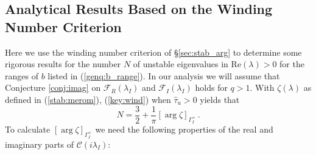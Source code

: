 \documentclass{article}%
\begin{document}
\subsection{Analytical Results Based on the Winding Number Criterion}
\label{genq:wind_number}

Here we use the winding number criterion of \S \ref{sec:stab_arg} to
determine some rigorous results for the number $N$ of unstable
eigenvalues in $\mbox{Re}(\lambda)>0$ for the ranges of $b$ listed in
(\ref{genq:b_range}). In our analysis we will assume that Conjecture
\ref{conj:imag} on ${\mathcal F}_R(\lambda_I)$ and ${\mathcal
  F}_I(\lambda_I)$ holds for $q>1$.  With $\zeta(\lambda)$ as defined
in (\ref{stab:merom}), (\ref{key:wind}) when $\hat{\tau}_u>0$ yields
that
\begin{equation}\label{genq:wind}
  N = \frac{3}{2} + \frac{1}{\pi} \left[\arg \zeta \right]_{\Gamma_I^{+}} \,.
\end{equation}
To calculate $\left[\arg \zeta \right]_{\Gamma_I^{+}}$ we need the
following properties of the real and imaginary parts of ${\mathcal
  C}(i\lambda_I)$:
\end{document}
